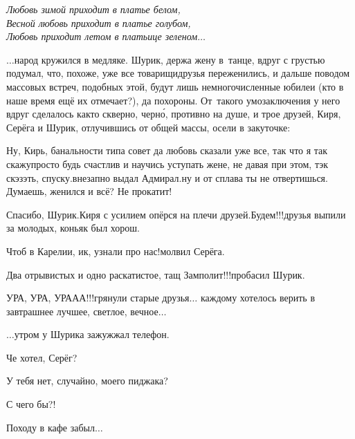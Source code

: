 {\vspace{0.1cm}
\noindent\textit{%
	\hspace*{1.4cm}Любовь зимой приходит в платье белом,\\
	\hspace*{1.4cm}Весной любовь приходит в платье голубом,\\
	\hspace*{1.4cm}Любовь приходит летом в платьице зеленом$\ldots$
}

$\ldots$народ кружился в медляке. Шурик, держа жену в~танце, вдруг с грустью подумал, что, похоже, уже все товарищи\sdash друзья переженились, и дальше поводом массовых встреч, подобных этой, будут лишь немногочисленные юбилеи (кто в наше время ещё их отмечает?), да похороны. От~такого умозаключения у него вдруг сделалось как\sdash то скверно, черн\'{о}, противно на душе, и трое друзей, Киря, Серёга и Шурик, отлучившись от общей массы, осели в закуточке:

\diagdash Ну, Кирь, банальности типа совет да любовь сказали уже все, так что я так скажу\mdash просто будь счастлив и научись уступать жене, не давая при этом, тэк скэзэть, спуску.\mdash внезапно выдал Адмирал.\mdash ну и от сплава ты не отвертишься. Думаешь, женился и всё? Не прокатит!

\diagdash Спасибо, Шурик.\mdash Киря с усилием опёрся на плечи друзей.\mdash Будем!!!\mdash друзья выпили за молодых, коньяк был хорош.

\diagdash Чтоб в Карелии, ик, узнали про нас!\mdash молвил Серёга.

\diagdash Два отрывистых и одно раскатистое, тащ Замполит!!!\mdash пробасил Шурик.

\diagdash УРА, УРА, УРА\sdash А\sdash А!!!\mdash грянули старые друзья$\ldots$ каждому хотелось верить в завтрашнее лучшее, светлое, вечное$\ldots$

\vspace{1.5cm}

$\ldots$утром у Шурика зажужжал телефон. 

\diagdash Че хотел, Серёг?

\diagdash У тебя нет, случайно, моего пиджака?

\diagdash С чего бы?!

\diagdash Походу в кафе забыл$\ldots$

\begin{center}
\end{center}
}